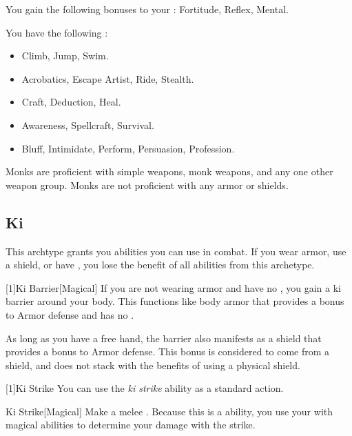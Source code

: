         You gain the following bonuses to your :  Fortitude,  Reflex,  Mental.

        You have the following :
        \begin{itemize}
            \item {} Climb, Jump, Swim.
            \item {} Acrobatics, Escape Artist, Ride, Stealth.
            \item {} Craft, Deduction, Heal.
            \item {} Awareness, Spellcraft, Survival.
            \item {} Bluff, Intimidate, Perform, Persuasion, Profession.
        \end{itemize}

        Monks are proficient with simple weapons, monk weapons, and any one other weapon group.
        Monks are not proficient with any armor or shields.

    \subsection{Ki}
        This archtype grants you abilities you can use in combat.
        If you wear armor, use a shield, or have , you lose the benefit of all abilities from this archetype.

        [1]{Ki Barrier}[Magical]
        If you are not wearing armor and have no , you gain a ki barrier around your body.
        This functions like body armor that provides a  bonus to Armor defense and has no .

        As long as you have a free hand, the barrier also manifests as a shield that provides a  bonus to Armor defense.
        This bonus is considered to come from a shield, and does not stack with the benefits of using a physical shield.

        [1]{Ki Strike} You can use the \textit{ki strike} ability as a standard action.
        \begin{freeability}{Ki Strike}[Magical]
            Make a melee .
            Because this is a  ability, you use your  with magical abilities to determine your damage with the strike.
        \end{freeability}

